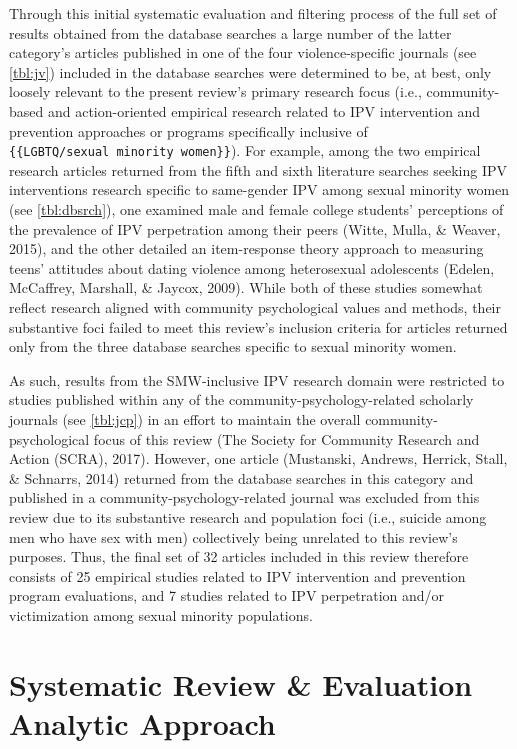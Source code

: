 \documentclass[11pt,]{tufte-book}
\begin{document}
Through this initial systematic evaluation and filtering process of the
full set of results obtained from the database searches a large number
of the latter category's articles published in one of the four
violence-specific journals (see \cref{tbl:jv}) included
in the database searches were determined to be, at best, only loosely
relevant to the present review's primary research focus (i.e.,
community-based and action-oriented empirical research related to IPV
intervention and prevention approaches or programs specifically
inclusive of \texttt{\{\{LGBTQ/sexual\ minority\ women\}\}}). For
example, among the two empirical research articles returned from the
fifth and sixth literature searches seeking IPV interventions research
specific to same-gender IPV among sexual minority women (see
\cref{tbl:dbsrch}), one examined male and female college
students' perceptions of the prevalence of IPV perpetration among their
peers (Witte, Mulla, \& Weaver, 2015), and the other detailed an
item-response theory approach to measuring teens' attitudes about dating
violence among heterosexual adolescents (Edelen, McCaffrey, Marshall, \&
Jaycox, 2009). While both of these studies somewhat reflect research
aligned with community psychological values and methods, their
substantive foci failed to meet this review's inclusion criteria for
articles returned only from the three database searches specific to
sexual minority women.

As such, results from the SMW-inclusive IPV research domain were
restricted to studies published within any of the
community-psychology-related scholarly journals (see
\cref{tbl:jcp}) in an effort to maintain the overall
community-psychological focus of this review (The Society for Community
Research and Action (SCRA), 2017). However, one article (Mustanski,
Andrews, Herrick, Stall, \& Schnarrs, 2014) returned from the database
searches in this category and published in a
community-psychology-related journal was excluded from this review due
to its substantive research and population foci (i.e., suicide among men
who have sex with men) collectively being unrelated to this review's
purposes. Thus, the final set of 32 articles included in this review
therefore consists of 25 empirical studies related to IPV intervention
and prevention program evaluations, and 7 studies related to IPV
perpetration and/or victimization among sexual minority populations.

\section{Systematic Review \& Evaluation Analytic
Approach}\label{systematic-review-evaluation-analytic-approach}
\end{document}
